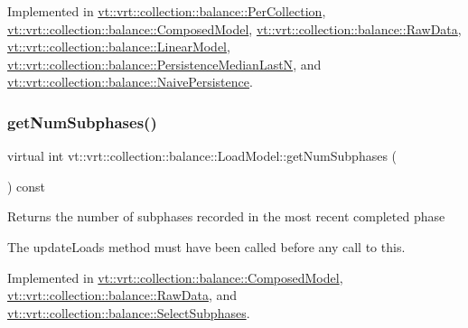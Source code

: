 Implemented in \hyperlink{structvt_1_1vrt_1_1collection_1_1balance_1_1_per_collection_ad71f5405a169c5fe2a25668df96c3a7c}{vt\+::vrt\+::collection\+::balance\+::\+Per\+Collection}, \hyperlink{classvt_1_1vrt_1_1collection_1_1balance_1_1_composed_model_a20bb994d1b3b27eb2a82729d7d5c30f3}{vt\+::vrt\+::collection\+::balance\+::\+Composed\+Model}, \hyperlink{structvt_1_1vrt_1_1collection_1_1balance_1_1_raw_data_ad81a96c22f81405e93bf162e6aafbeed}{vt\+::vrt\+::collection\+::balance\+::\+Raw\+Data}, \hyperlink{structvt_1_1vrt_1_1collection_1_1balance_1_1_linear_model_ae1a9d609a834df8d672992de8184e458}{vt\+::vrt\+::collection\+::balance\+::\+Linear\+Model}, \hyperlink{structvt_1_1vrt_1_1collection_1_1balance_1_1_persistence_median_last_n_a4f65801b9a93bfbc24e98b8ff1e111bc}{vt\+::vrt\+::collection\+::balance\+::\+Persistence\+Median\+LastN}, and \hyperlink{structvt_1_1vrt_1_1collection_1_1balance_1_1_naive_persistence_a2842669870cdef1ab7d5f63d23951f69}{vt\+::vrt\+::collection\+::balance\+::\+Naive\+Persistence}.

\mbox{\label{structvt_1_1vrt_1_1collection_1_1balance_1_1_load_model_aa7ddeca4fc8de99bc25a895e207de2e6}} 
\subsubsection{\texorpdfstring{get\+Num\+Subphases()}{getNumSubphases()}}
{\footnotesize\ttfamily virtual int vt\+::vrt\+::collection\+::balance\+::\+Load\+Model\+::get\+Num\+Subphases (\begin{DoxyParamCaption}{ }\end{DoxyParamCaption}) const\hspace{0.3cm}{\ttfamily [pure virtual]}}

Returns the number of subphases recorded in the most recent completed phase

The {\ttfamily update\+Loads} method must have been called before any call to this. 

Implemented in \hyperlink{classvt_1_1vrt_1_1collection_1_1balance_1_1_composed_model_a744a16572614d11e554b1bf53b7c57f6}{vt\+::vrt\+::collection\+::balance\+::\+Composed\+Model}, \hyperlink{structvt_1_1vrt_1_1collection_1_1balance_1_1_raw_data_a252d51c7265f225736068a4ae87b4a0a}{vt\+::vrt\+::collection\+::balance\+::\+Raw\+Data}, and \hyperlink{classvt_1_1vrt_1_1collection_1_1balance_1_1_select_subphases_aa92c8fa929624c30a25442391bc3e80d}{vt\+::vrt\+::collection\+::balance\+::\+Select\+Subphases}.

